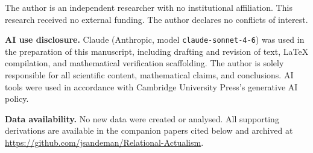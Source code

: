\documentclass[11pt,a4paper]{article}
\theoremstyle{plain}
\theoremstyle{definition}
\theoremstyle{remark}
\begin{document}
The author is an independent researcher with no institutional affiliation.
This research received no external funding. The author declares no
conflicts of interest.

\smallskip\noindent
\textbf{AI use disclosure.}
Claude (Anthropic, model \texttt{claude-sonnet-4-6}) was used in the
preparation of this manuscript, including drafting and revision of text,
\LaTeX{} compilation, and mathematical verification scaffolding.
The author is solely responsible for all scientific content,
mathematical claims, and conclusions.
AI tools were used in accordance with Cambridge University Press's
generative AI policy.

\smallskip\noindent
\textbf{Data availability.}
No new data were created or analysed. All supporting derivations are
available in the companion papers cited below and archived at
\url{https://github.com/jsandeman/Relational-Actualism}.
\end{document}
